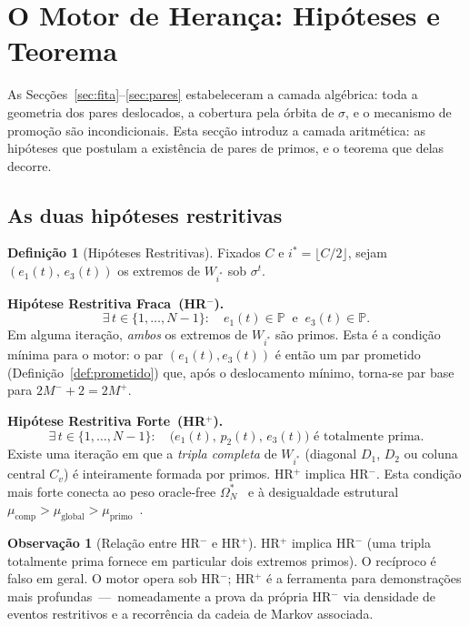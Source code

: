 \documentclass[12pt, a4paper]{article}
\theoremstyle{plain}
\theoremstyle{definition}
\newtheorem{definition}[theorem]{Definição}
\newtheorem{remark}[theorem]{Observação}
\theoremstyle{remark}
\begin{document}
	\section{O Motor de Herança: Hipóteses e Teorema}
	\label{sec:motor}
	
	As Secções~\ref{sec:fita}--\ref{sec:pares} estabeleceram a camada
	algébrica: toda a geometria dos pares deslocados, a cobertura pela
	órbita de $\sigma$, e o mecanismo de promoção são incondicionais.
	Esta secção introduz a camada aritmética: as hipóteses que postulam
	a existência de pares de primos, e o teorema que delas decorre.
	
	\subsection{As duas hipóteses restritivas}
	
	\begin{definition}[Hipóteses Restritivas]
		\label{def:HR}
		Fixados $C$ e $i^*=\lfloor C/2\rfloor$, sejam
		$(e_1(t),\,e_3(t))$ os extremos de $W_{i^*}$ sob $\sigma^t$.
		
		\medskip
		\textbf{Hipótese Restritiva Fraca~(HR$^-$).}
		\[
		\exists\, t\in\{1,\ldots,N-1\}:
		\quad e_1(t)\in\mathbb{P}
		\;\;\text{e}\;\;
		e_3(t)\in\mathbb{P}.
		\]
		Em alguma iteração, \emph{ambos} os extremos de $W_{i^*}$ são
		primos.  Esta é a condição mínima para o motor: o par
		$(e_1(t),e_3(t))$ é então um par prometido (Definição~\ref{def:prometido})
		que, após o deslocamento mínimo, torna-se par base para
		$2M^-+2=2M^+$.
		
		\medskip
		\textbf{Hipótese Restritiva Forte~(HR$^+$).}
		\[
		\exists\, t\in\{1,\ldots,N-1\}:
		\quad \bigl(e_1(t),\,p_2(t),\,e_3(t)\bigr)
		\text{ é totalmente prima.}
		\]
		Existe uma iteração em que a \emph{tripla completa} de $W_{i^*}$
		(diagonal $D_1$, $D_2$ ou coluna central $C_v$) é inteiramente
		formada por primos.  HR$^+$ implica HR$^-$.  Esta condição mais
		forte conecta ao peso oracle-free $\Omega_N^*$~\cite{peso} e à
		desigualdade estrutural
		$\mu_{\text{comp}}>\mu_{\text{global}}>\mu_{\text{primo}}$~\cite{problemaB}.
	\end{definition}
	
	\begin{remark}[Relação entre HR$^-$ e HR$^+$]
		HR$^+$ implica HR$^-$ (uma tripla totalmente prima fornece em
		particular dois extremos primos).  O recíproco é falso em geral.
		O motor opera sob HR$^-$; HR$^+$ é a ferramenta para
		demonstrações mais profundas~---~nomeadamente a prova da própria
		HR$^-$ via densidade de eventos restritivos e a recorrência da
		cadeia de Markov associada.
	\end{remark}
	
\end{document}
